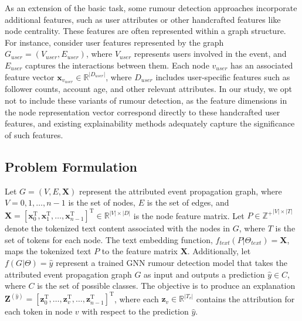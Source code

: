As an extension of the basic task, some rumour detection approaches incorporate additional features, such as user attributes or other handcrafted features like node centrality. These features are often represented within a graph structure. For instance, consider user features represented by the graph $G_{user} = (V_{user}, E_{user})$, where $V_{user}$ represents users involved in the event, and $E_{user}$ captures the interactions between them. Each node $v_{user}$ has an associated feature vector $\textbf{x}_{v_{user}} \in \mathbb{R}^{|D_{user}|}$,  where $D_{user}$ includes user-specific features such as follower counts, account age, and other relevant attributes. In our study, we opt not to include these variants of rumour detection, as the feature dimensions in the node representation vector correspond directly to these handcrafted user features, and existing explainability methods adequately capture the significance of such features.

\subsection{Problem Formulation}
Let $G = (V, E, \textbf{X})$ represent the attributed event propagation graph, where $V = {0, 1, \ldots, n-1}$ is the set of nodes, $E$ is the set of edges, and $\textbf{X} = [\textbf{x}_0^\text{T}, \textbf{x}_1^\text{T}, \ldots, \textbf{x}_{n-1}^\text{T}]^\text{T} \in \mathbb{R}^{|V| \times |D|}$ is the node feature matrix. Let $P \in \mathbb{Z^+}^{|V| \times |T|}$ denote the tokenized text content associated with the nodes in $G$, where $T$ is the set of tokens for each node. The text embedding function, $f_{text}(P|\Theta_{text}) = \textbf{X}$, maps the tokenized text $P$ to the feature matrix $\textbf{X}$. Additionally, let $f(G|\Theta) = \hat{y}$ represent a trained GNN rumour detection model that takes the attributed event propagation graph $G$ as input and outputs a prediction $\hat{y} \in C$, where $C$ is the set of possible classes. The objective is to produce an explanation $\textbf{Z}^{(\hat{y})} = [\textbf{z}_0^\text{T}, \ldots, \textbf{z}_v^\text{T}, \ldots, \textbf{z}_{n-1}^\text{T}]^\text{T}$, where each $\textbf{z}_v \in \mathbb{R}^{|T_v|}$ contains the attribution for each token in node $v$ with respect to the prediction $\hat{y}$.
